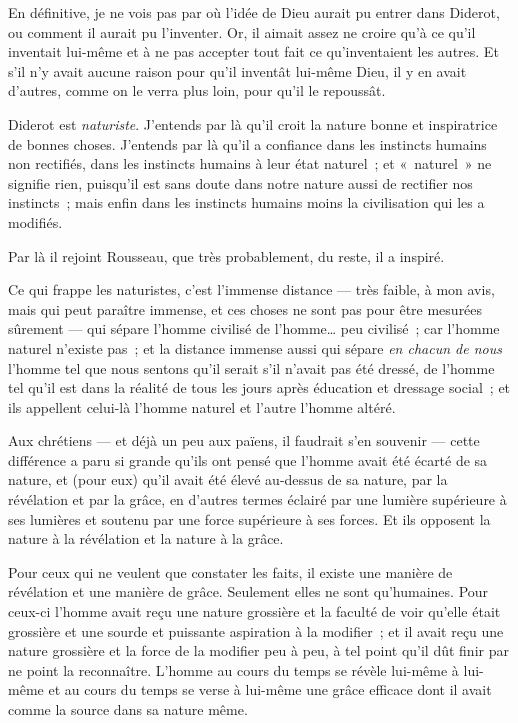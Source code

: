 \documentclass[french,twoside]{book} %
\begin{document}
En définitive, je ne vois pas par où l’idée de Dieu aurait pu entrer dans Diderot, ou comment il aurait pu l’inventer. Or, il aimait assez ne croire qu’à ce qu’il inventait lui-même et à ne pas accepter tout fait ce qu’inventaient les autres. Et s’il n’y avait aucune raison pour qu’il inventât lui-même Dieu, il y en avait d’autres, comme on le verra plus loin, pour qu’il le repoussât.\par
Diderot est {\itshape naturiste}. J’entends par là qu’il croit la nature bonne et inspiratrice de bonnes choses. J’entends par là qu’il a confiance dans les instincts humains non rectifiés, dans les instincts humains à leur état naturel ; et « naturel » ne signifie rien, puisqu’il est sans doute dans notre nature aussi de rectifier nos instincts ; mais enfin dans les instincts humains moins la civilisation qui les a modifiés.\par
Par là il rejoint Rousseau, que très probablement, du reste, il a inspiré.\par
Ce qui frappe les naturistes, c’est l’immense distance — très faible, à mon avis, mais qui peut paraître immense, et ces choses ne sont pas pour être mesurées sûrement — qui sépare l’homme  civilisé de l’homme… peu civilisé ; car l’homme naturel n’existe pas ; et la distance immense aussi qui sépare {\itshape en chacun de nous} l’homme tel que nous sentons qu’il serait s’il n’avait pas été dressé, de l’homme tel qu’il est dans la réalité de tous les jours après éducation et dressage social ; et ils appellent celui-là l’homme naturel et l’autre l’homme altéré.\par
Aux chrétiens — et déjà un peu aux païens, il faudrait s’en souvenir — cette différence a paru si grande qu’ils ont pensé que l’homme avait été écarté de sa nature, et (pour eux) qu’il avait été élevé au-dessus de sa nature, par la révélation et par la grâce, en d’autres termes éclairé par une lumière supérieure à ses lumières et soutenu par une force supérieure à ses forces. Et ils opposent la nature à la révélation et la nature à la grâce.\par
Pour ceux qui ne veulent que constater les faits, il existe une manière de révélation et une manière de grâce. Seulement elles ne sont qu’humaines. Pour ceux-ci l’homme avait reçu une nature grossière et la faculté de voir qu’elle était grossière et une sourde et puissante aspiration à la modifier ; et il avait reçu une nature grossière et la force de la modifier peu à peu, à tel point qu’il dût finir par ne point la reconnaître. L’homme au cours du temps se révèle lui-même à lui-même et au cours  du temps se verse à lui-même une grâce efficace dont il avait comme la source dans sa nature même.\par
\end{document}
